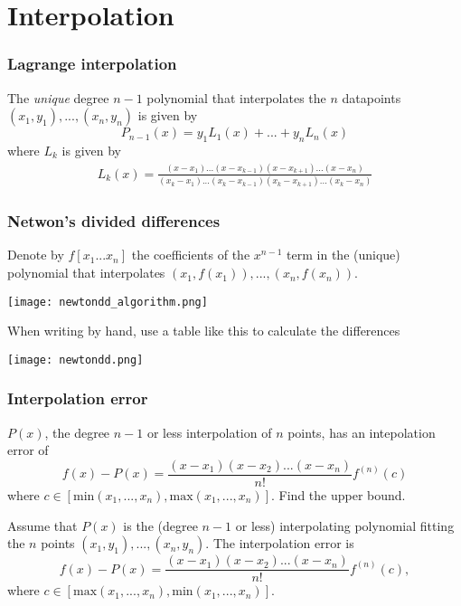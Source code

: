 \section{Interpolation}
\subsubsection{Lagrange interpolation}
The \textit{unique} degree $n-1$ polynomial that interpolates the $n$ datapoints $(x_1, y_1), ..., (x_n, y_n)$ is given by
$$
P_{n-1}(x) = y_1L_1(x) + ... + y_nL_n(x)
$$
where $L_k$ is given by
\begin{gather*}
L_k(x) = \frac{(x-x_1)...(x-x_{k-1})(x-x_{k+1})...(x-x_n)}{(x_k-x_1)...(x_k - x_{k-1})(x_k - x_{k+1})...(x_k-x_n)}
\end{gather*}

\subsubsection{Netwon's divided differences}
\begin{definition}
Denote by $f[x_1...x_n]$ the coefficients of the $x^{n-1}$ term in the (unique) polynomial that interpolates $(x_1, f(x_1)), ..., (x_n,f(x_n))$.
\end{definition}

\begin{center}
\texttt{[image: newtondd\_algorithm.png]}
\end{center}

When writing by hand, use a table like this to calculate the differences
\begin{center}
\texttt{[image: newtondd.png]}
\end{center}

\subsubsection{Interpolation error}

\begin{theorem}
$P(x)$, the degree $n-1$ or less interpolation of $n$ points, has an intepolation error of
$$
f(x) - P(x) = \frac{(x-x_1)(x-x_2)...(x-x_n)}{n!}f^{(n)}(c)
$$
where $c \in [\text{min}(x_1,...,x_n), \text{max}(x_1,...,x_n)]$. Find the upper bound.
\end{theorem}

\begin{theorem}
Assume that $P(x)$ is the (degree $n-1$ or less) interpolating polynomial fitting the $n$ points $(x_1,y_1),...,(x_n,y_n)$. The interpolation error is
$$
f(x)-P(x) = \frac{(x-x_1)(x-x_2)...(x-x_n)}{n!}f^{(n)}(c),
$$
where $c \in [\text{max}(x_1,...,x_n), \text{min}(x_1,...,x_n)]$.
\end{theorem}

